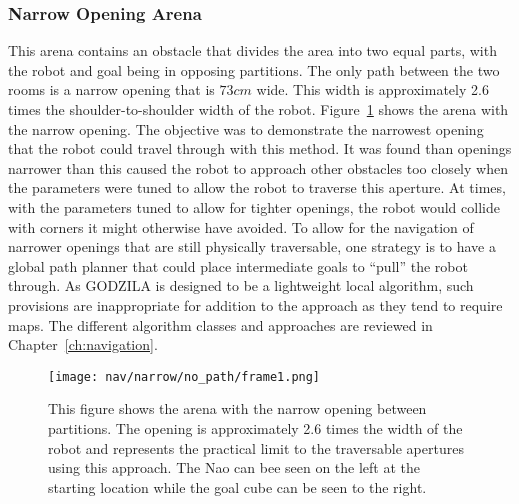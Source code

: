 \subsubsection{Narrow Opening Arena}
This arena contains an obstacle that divides the area into two equal
parts, with the robot and goal being in opposing partitions. The only path between
the two rooms is a narrow opening that is $73 cm$ wide. This width is approximately
2.6 times the shoulder-to-shoulder width of the robot. 
Figure~\ref{fig:nav_narrow_setup1} shows the arena with the narrow opening.
The objective was to demonstrate the narrowest opening that the robot could travel through with this method.
It was found than openings narrower than this caused the robot to approach other obstacles too 
closely when the parameters were tuned to allow the robot to traverse this aperture.
At times, with the parameters tuned to allow for tighter openings, the robot would
collide with corners it might otherwise have avoided.
To allow for the navigation of narrower openings that are still physically traversable,
one strategy is to have a global path planner that could place intermediate goals
to ``pull'' the robot through. As GODZILA is designed to be a lightweight local algorithm,
such provisions are inappropriate for addition to the approach as they tend to require maps.
The different algorithm classes and approaches are reviewed in Chapter~\ref{ch:navigation}.


\begin{figure}
  \texttt{[image: nav/narrow/no\_path/frame1.png]}
  \caption{This figure shows the arena with the narrow opening between partitions.
           The opening is approximately 2.6 times the width of the robot and represents
           the practical limit to the traversable apertures using this approach.
           The Nao can bee seen on the left at the starting location
           while the goal cube can be seen to the right.}
  \label{fig:nav_narrow_setup1}
\end{figure}

